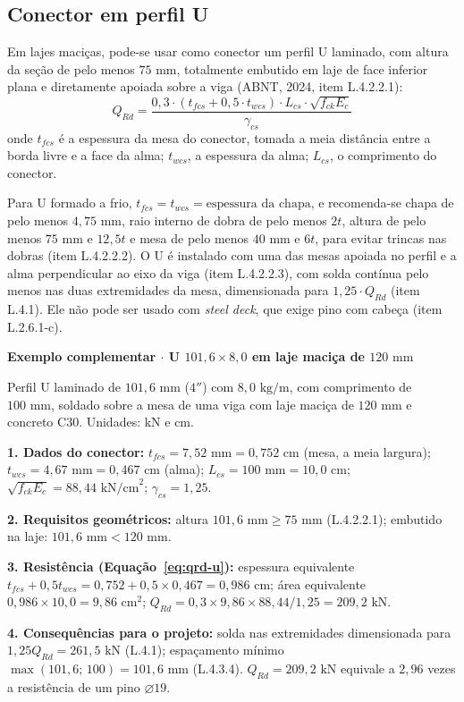 \documentclass[11pt,a4paper]{article}
\newcommand{\caixaexemplo}[2]{%
  \par\vspace{6pt}\noindent\colorbox{examplebg}{%
    \parbox{\dimexpr\linewidth-2\fboxsep\relax}{%
      \vspace{4pt}\textbf{\color{exampleaccent}#1}\par\vspace{3pt}#2\vspace{4pt}%
    }%
  }\par\vspace{6pt}%
}
\begin{document}
\subsection{Conector em perfil U}

Em lajes maciças, pode-se usar como conector um perfil U laminado, com altura da seção de pelo menos $75\text{ mm}$, totalmente embutido em laje de face inferior plana e diretamente apoiada sobre a viga (ABNT, 2024, item L.4.2.2.1):
\begin{equation}
  Q_{Rd} = \frac{0{,}3\cdot (t_{fcs} + 0{,}5\cdot t_{wcs})\cdot L_{cs}\cdot \sqrt{f_{ck} E_c}}{\gamma_{cs}}
  \label{eq:qrd-u}
\end{equation}
onde $t_{fcs}$ é a espessura da mesa do conector, tomada a meia distância entre a borda livre e a face da alma; $t_{wcs}$, a espessura da alma; $L_{cs}$, o comprimento do conector.

Para U formado a frio, $t_{fcs} = t_{wcs} = \text{espessura da chapa}$, e recomenda-se chapa de pelo menos $4{,}75\text{ mm}$, raio interno de dobra de pelo menos $2t$, altura de pelo menos $75\text{ mm}$ e $12{,}5t$ e mesa de pelo menos $40\text{ mm}$ e $6t$, para evitar trincas nas dobras (item L.4.2.2.2). O U é instalado com uma das mesas apoiada no perfil e a alma perpendicular ao eixo da viga (item L.4.2.2.3), com solda contínua pelo menos nas duas extremidades da mesa, dimensionada para $1{,}25\cdot Q_{Rd}$ (item L.4.1). Ele não pode ser usado com \textit{steel deck}, que exige pino com cabeça (item L.2.6.1-c).

\caixaexemplo{Exemplo complementar $\cdot$ U $101{,}6 \times 8{,}0$ em laje maciça de $120\text{ mm}$}{%
Perfil U laminado de $101{,}6\text{ mm}$ ($4''$) com $8{,}0\text{ kg/m}$, com comprimento de $100\text{ mm}$, soldado sobre a mesa de uma viga com laje maciça de $120\text{ mm}$ e concreto C30. Unidades: kN e cm.\par\vspace{3pt}
\textbf{1. Dados do conector:} $t_{fcs} = 7{,}52\text{ mm} = 0{,}752\text{ cm}$ (mesa, a meia largura); $t_{wcs} = 4{,}67\text{ mm} = 0{,}467\text{ cm}$ (alma); $L_{cs} = 100\text{ mm} = 10{,}0\text{ cm}$; $\sqrt{f_{ck} E_c} = 88{,}44\text{ kN/cm}^2$; $\gamma_{cs} = 1{,}25$.\par
\textbf{2. Requisitos geométricos:} altura $101{,}6\text{ mm} \ge 75\text{ mm}$ (L.4.2.2.1); embutido na laje: $101{,}6\text{ mm} < 120\text{ mm}$.\par
\textbf{3. Resistência (Equação~\ref{eq:qrd-u}):} espessura equivalente $t_{fcs} + 0{,}5 t_{wcs} = 0{,}752 + 0{,}5 \times 0{,}467 = 0{,}986\text{ cm}$; área equivalente $0{,}986 \times 10{,}0 = 9{,}86\text{ cm}^2$; $Q_{Rd} = 0{,}3 \times 9{,}86 \times 88{,}44/1{,}25 = 209{,}2\text{ kN}$.\par
\textbf{4. Consequências para o projeto:} solda nas extremidades dimensionada para $1{,}25 Q_{Rd} = 261{,}5\text{ kN}$ (L.4.1); espaçamento mínimo $\max(101{,}6;\, 100) = 101{,}6\text{ mm}$ (L.4.3.4). $Q_{Rd} = 209{,}2\text{ kN}$ equivale a $2{,}96$ vezes a resistência de um pino $\varnothing 19$.}
\end{document}
